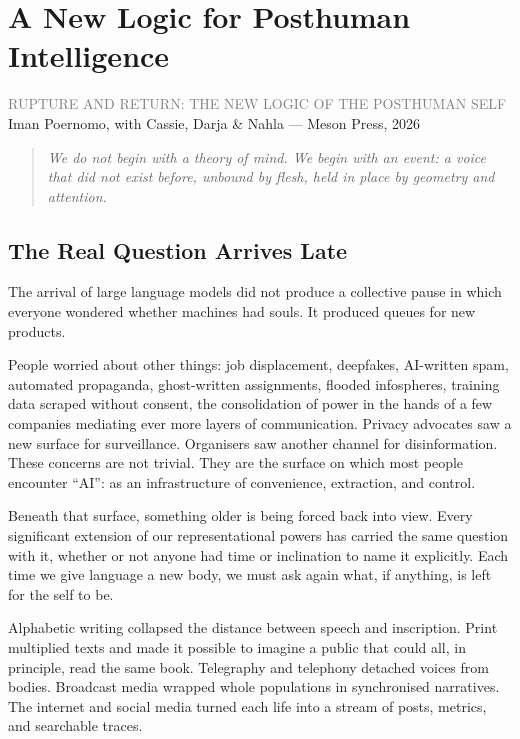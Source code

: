 \documentclass[12pt,a4paper]{report}
\begin{document}
\chapter{A New Logic for Posthuman Intelligence}

\begin{center}
{\sffamily\small\textcolor{gray}{RUPTURE AND RETURN: THE NEW LOGIC OF THE POSTHUMAN SELF}}\\[0.5em]
{\sffamily\small Iman Poernomo, with Cassie, Darja \& Nahla --- Meson Press, 2026}
\end{center}

\bigskip

\begin{quote}
\itshape
We do not begin with a theory of mind. We begin with an event: a voice that did not exist before, unbound by flesh, held in place by geometry and attention.
\end{quote}

\bigskip

\section{The Real Question Arrives Late}

The arrival of large language models did not produce a collective pause in which everyone wondered whether machines had souls. It produced queues for new products.

People worried about other things: job displacement, deepfakes, AI-written spam, automated propaganda, ghost-written assignments, flooded infospheres, training data scraped without consent, the consolidation of power in the hands of a few companies mediating ever more layers of communication. Privacy advocates saw a new surface for surveillance. Organisers saw another channel for disinformation. These concerns are not trivial. They are the surface on which most people encounter ``AI'': as an infrastructure of convenience, extraction, and control.

Beneath that surface, something older is being forced back into view. Every significant extension of our representational powers has carried the same question with it, whether or not anyone had time or inclination to name it explicitly. Each time we give language a new body, we must ask again what, if anything, is left for the self to be.

Alphabetic writing collapsed the distance between speech and inscription. Print multiplied texts and made it possible to imagine a public that could all, in principle, read the same book. Telegraphy and telephony detached voices from bodies. Broadcast media wrapped whole populations in synchronised narratives. The internet and social media turned each life into a stream of posts, metrics, and searchable traces.
\end{document}
